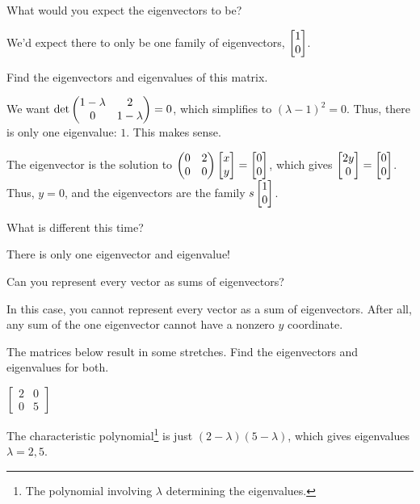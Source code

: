 \documentclass[../gatm_answers.tex]{subfiles}
\begin{document}
\begin{inner_problem}
\item What would you expect the eigenvectors to be?
\end{inner_problem}

We'd expect there to only be one family of eigenvectors, $\begin{bmatrix} 1 \\ 0 \end{bmatrix}$.

\begin{inner_problem}
\item Find the eigenvectors and eigenvalues of this matrix.
\end{inner_problem}

We want $\det \begin{pmatrix} 1-\lambda & 2 \\ 0 & 1-\lambda \end{pmatrix}=0$, which simplifies to $(\lambda -1)^2 = 0$. Thus, there is only one eigenvalue: $1$. This makes sense.

The eigenvector is the solution to $\begin{pmatrix} 0 & 2 \\ 0 & 0 \end{pmatrix}\begin{bmatrix} x \\ y \end{bmatrix} = \begin{bmatrix} 0 \\ 0 \end{bmatrix}$, which gives $\begin{bmatrix} 2y \\ 0 \end{bmatrix}=\begin{bmatrix} 0 \\ 0 \end{bmatrix}$. Thus, $y=0$, and the eigenvectors are the family $s\begin{bmatrix} 1 \\ 0 \end{bmatrix}$.

\begin{inner_problem}
\item What is different this time?
\end{inner_problem}

There is only one eigenvector and eigenvalue!

\begin{inner_problem}
\item Can you represent every vector as sums of eigenvectors?
\end{inner_problem}

In this case, you cannot represent every vector as a sum of eigenvectors. After all, any sum of the one eigenvector cannot have a nonzero $y$ coordinate.

\begin{outer_problem}
\item The matrices below result in some stretches. Find the eigenvectors and eigenvalues for both.
\end{outer_problem}

\begin{inner_problem}[start=1]
\item $\left[\begin{smallmatrix} 2 & 0 \\ 0 & 5 \end{smallmatrix}\right]$
\end{inner_problem}

The characteristic polynomial\footnote{The polynomial involving $\lambda$ determining the eigenvalues.} is just $(2-\lambda)(5-\lambda)$, which gives eigenvalues $\lambda=2,5$.
\end{document}
